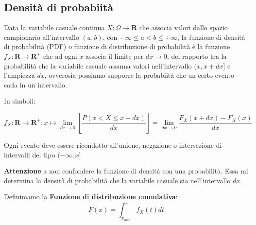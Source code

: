 \documentclass{article}
\begin{document}
\subsection{Densità di probabiità}

 Data la variabile casuale continua \( X: \Omega \to \mathbf{R} \) che associa valori dallo spazio campionario all'intervallo 
 \((a, b)\), con \( -\infty \leq a < b \leq +\infty \), la funzione di densità di probabilità (PDF) o funzione di distribuzione di probabilità è 
 la funzione \( f_X: \mathbf{R} \to \mathbf{R}^+ \) che ad ogni \( x \) associa il limite per \( dx \rightarrow 0\), del rapporto tra la probabilità 
 che la variabile casuale assuma valori nell'intervallo \((x, x + dx]\) e l'ampiezza \( dx \), ovverosia possiamo supporre la probabiità che un certo 
 evento cada in un intervallo.

 In simboli:
 
 \[ f_X: \mathbf{R} \to \mathbf{R}^+ : x \mapsto \lim_{dx \to 0} \left[ \frac{P(x < X \leq x + dx)}{dx} \right] = \lim_{dx \to 0} \frac{F_X(x+dx)- F_X(x)}{dx}\]

 Ogni evento deve essere ricondotto all'unione, negazione o intersezione di intervalli del tipo $( -\infty, x] $

 \textbf{Attenzione} a non confondere la funzione di densità con una probabilità.
 Essa mi determina la densità di probabilità che la variabile casuale sia nell'intervallo $dx$.

 Definimamo la \textbf{Funzione di distribuzione cumulativa}:
 \[
 F(x)=\int_{x_{min}}^x f_X(t)dt
 \]


\begin{center}
\end{center}
\end{document}
